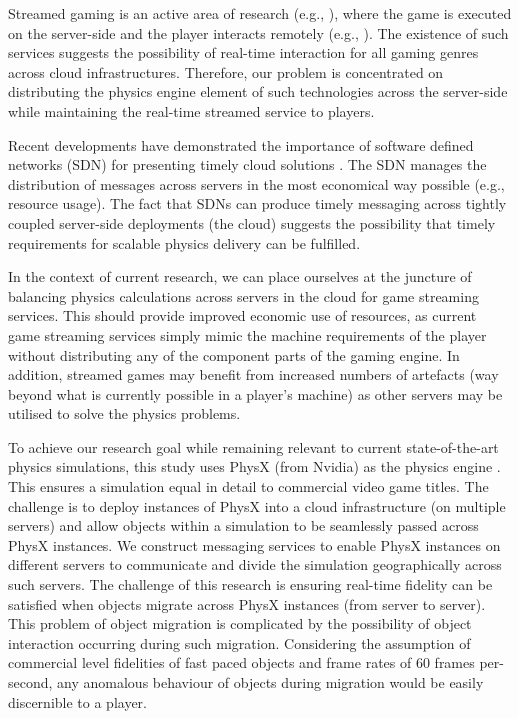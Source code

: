 Streamed gaming is an active area of research (e.g., \cite{GARCIAVALLS}), where the game is executed on the server-side and the player interacts remotely (e.g., \cite{PSNOW, NVidiaGameStream}). The existence of such services suggests the possibility of real-time interaction for all gaming genres across cloud infrastructures. Therefore, our problem is concentrated on distributing the physics engine element of such technologies across the server-side while maintaining the real-time streamed service to players.

Recent developments have demonstrated the importance of software defined networks (SDN) for presenting timely cloud solutions \cite{Wang, Kumar}. The SDN manages the distribution of messages across servers in the most economical way possible (e.g., resource usage). The fact that SDNs can produce timely messaging across tightly coupled server-side deployments (the cloud) suggests the possibility that timely requirements for scalable physics delivery can be fulfilled.

In the context of current research, we can place ourselves at the juncture of balancing physics calculations across servers in the cloud for game streaming services. This should provide improved economic use of resources, as current game streaming services simply mimic the machine requirements of the player without distributing any of the component parts of the gaming engine. In addition, streamed games may benefit from increased numbers of artefacts (way beyond what is currently possible in a player's machine) as other servers may be utilised to solve the physics problems.

To achieve our research goal while remaining relevant to current state-of-the-art physics simulations, this study uses PhysX (from Nvidia) as the physics engine \cite{PhysX}. This ensures a simulation equal in detail to commercial video game titles. The challenge is to deploy instances of PhysX into a cloud infrastructure (on multiple servers) and allow objects within a simulation to be seamlessly passed across PhysX instances. We construct messaging services to enable PhysX instances on different servers to communicate and divide the simulation geographically across such servers. The challenge of this research is ensuring real-time fidelity can be satisfied when objects migrate across PhysX instances (from server to server). This problem of object migration is complicated by the possibility of object interaction occurring during such migration. Considering the assumption of commercial level fidelities of fast paced objects and frame rates of 60 frames per-second, any anomalous behaviour of objects during migration would be easily discernible to a player.  

